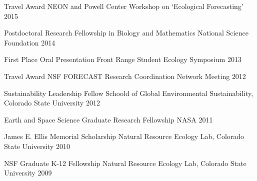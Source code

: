 


\begin{cvhonors}

  \cvhonor
    {Travel Award} %
    {NEON and Powell Center Workshop on `Ecological Forecasting'} %
    {\phantom} %
    {2015} %

  \cvhonor
    {Postdoctoral Research Fellowship in Biology and Mathematics} %
    {National Science Foundation} %
    {\phantom} %
    {2014} %

  \cvhonor
    {First Place Oral Presentation} %
    {Front Range Student Ecology Symposium} %
    {\phantom} %
    {2013} %

  \cvhonor
    {Travel Award} %
    {NSF FORECAST Research Coordination Network Meeting} %
    {\phantom} %
    {2012} %

  \cvhonor
    {Sustainability Leadership Fellow} %
    {Schoold of Global Environmental Sustainability, Colorado State University} %
    {\phantom} %
    {2012} %

  \cvhonor
    {Earth and Space Science Graduate Research Fellowship} %
    {NASA} %
    {\phantom} %
    {2011} %

  \cvhonor
    {James E. Ellis Memorial Scholarship} %
    {Natural Resource Ecology Lab, Colorado State University} %
    {\phantom} %
    {2010} %

\cvhonor
    {NSF Graduate K-12 Fellowship} %
    {Natural Resource Ecology Lab, Colorado State University} %
    {\phantom} %
    {2009} %

\end{cvhonors}
